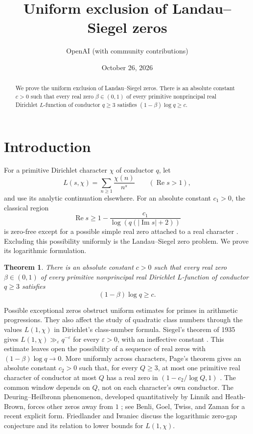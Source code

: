 \documentclass[11pt,a4paper]{amsart}
\title{Uniform exclusion of Landau--Siegel zeros}
\author{OpenAI (with community contributions)}
\date{October 26, 2026}
\newtheorem{theorem}{Theorem}
\theoremstyle{remark}
\numberwithin{equation}{section}
\begin{document}
\begin{abstract}
We prove the uniform exclusion of Landau--Siegel zeros. There is an
absolute constant $c>0$ such that every real zero $\beta\in(0,1)$ of
every primitive nonprincipal real Dirichlet $L$-function of conductor
$q\ge3$ satisfies $(1-\beta)\log q\ge c$.
\end{abstract}
\maketitle

\section{Introduction}\label{sec:intro}

For a primitive Dirichlet character $\chi$ of conductor $q$, let
\[
 L(s,\chi)=\sum_{n\ge1}\frac{\chi(n)}{n^s}
 \qquad(\operatorname{Re}s>1),
\]
and use its analytic continuation elsewhere. For an absolute constant
$c_1>0$, the classical region
\[
 \operatorname{Re}s\ge1-\frac{c_1}{\log(q(|\operatorname{Im}s|+2))}
\]
is zero-free except for a possible simple real zero attached to a real
character \cite[Section~14]{Davenport}. Excluding this possibility
uniformly is the Landau--Siegel zero problem. We prove its logarithmic
formulation.

\begin{theorem}\label{thm:main}
There is an absolute constant $c>0$ such that every real zero
$\beta\in(0,1)$ of every primitive nonprincipal real Dirichlet
$L$-function of conductor $q\ge3$ satisfies
\begin{equation}\label{eq:main}
 (1-\beta)\log q\ge c.
\end{equation}
\end{theorem}

Possible exceptional zeros obstruct uniform estimates for primes in
arithmetic progressions. They also affect the study of quadratic
class numbers through the values $L(1,\chi)$ in Dirichlet's
class-number formula. Siegel's theorem of 1935 gives
$L(1,\chi)\gg_\varepsilon q^{-\varepsilon}$ for every
$\varepsilon>0$, with an ineffective constant \cite{Siegel,Davenport}.
This estimate leaves open the possibility of a sequence of real zeros
with $(1-\beta)\log q\to0$. More uniformly across characters,
Page's theorem gives an absolute constant $c_2>0$ such that, for every
$Q\ge3$, at most one primitive real character of conductor at most $Q$
has a real zero in $(1-c_2/\log Q,1)$ \cite{Page}. The common window
depends on $Q$, not on each character's own conductor.
The Deuring--Heilbronn phenomenon, developed quantitatively by
Linnik and Heath-Brown, forces
other zeros away from $1$ \cite{Linnik,HeathBrown}; see Benli,
Goel, Twiss, and Zaman \cite{BGTZ} for a recent explicit form.
Friedlander and Iwaniec
\cite{FI} discuss the logarithmic zero-gap conjecture and its relation
to lower bounds for $L(1,\chi)$.
\end{document}
